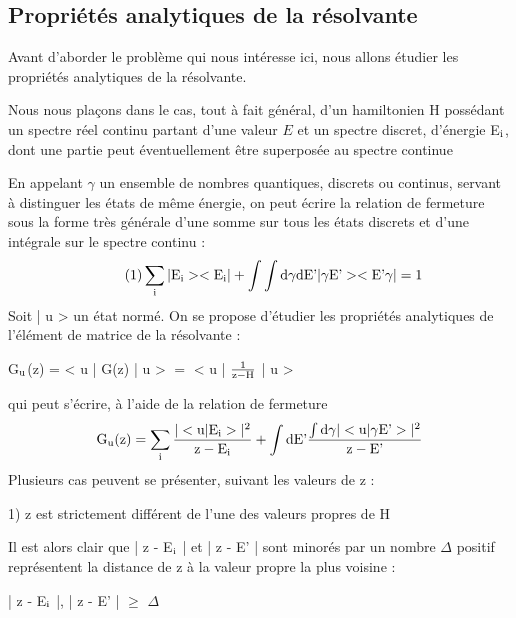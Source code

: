 \subsection{Propriétés analytiques de la résolvante} %

Avant d'aborder le problème qui nous intéresse ici, nous allons étudier les propriétés analytiques de la résolvante.

Nous nous plaçons dans le cas, tout à fait général, d'un hamiltonien H possédant un spectre réel continu partant d'une valeur $E$ et un spectre
discret, d'énergie E$_{\text{i}}$, dont une partie peut éventuellement être superposée au
spectre continue

\begin{center}  \end{center}

En appelant $\gamma$ un ensemble de nombres quantiques, discrets ou continus, servant à distinguer les états de même énergie, on peut écrire la relation
de fermeture sous la forme très générale d'une somme sur tous les états discrets
et d'une intégrale sur le spectre continu :
\[
\tag{1} \sum_{\text{i}} | \text{E}_{\text{i}} > < \text{E}_{\text{i}} | +
\int\int \text{d}\gamma \text{dE'} | \gamma\text{E'} > < \text{E'}\gamma | = 1
\]
Soit | u > un état normé. On se propose d'étudier les propriétés analytiques de
l'élément de matrice de la résolvante :
\begin{center}
G$_{\text{u}}$(z) = < u | G(z) | u > $=$ < u | $\frac{1}{\text{z}-\text{H}}$ | u >
\end{center}
qui peut s'écrire, à l'aide de la relation de fermeture
\[
\text{G}_{\text{u}}(\text{z}) = \sum_{\text{i}}
\frac{| < \text{u} | \text{E}_{\text{i}} > |^2}{\text{z}-\text{E}_{\text{i}}} +
\int \text{dE'}\frac{\int\text{d}\gamma |< \text{u} | \gamma\text{E'} >|^2 }{\text{z}-\text{E'}}
\]
Plusieurs cas peuvent se présenter, suivant les valeurs de z :

1) z est strictement différent de l'une des valeurs propres de H

Il est alors clair que | z - E$_{\text{i}}$ | et | z - E' | sont minorés par un
nombre $\Delta$ positif représentent la distance de z à la valeur propre la plus
voisine :
\begin{center}
 | z - E$_{\text{i}}$ |, | z - E' | $\geq$ $\Delta$
\end{center}

